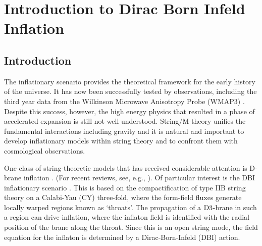 \renewcommand{\CVSrevision}{\version$Id: dbi-intro.tex,v 1.9 2009/07/28 10:13:51 ith Exp $}
\chapter{Introduction to Dirac Born Infeld Inflation}
\label{ch:dbi-intro}

\section{Introduction}
% 
\label{sec:dbi-intro}


The inflationary scenario provides the 
theoretical framework for the early history 
of the universe. It has now been successfully tested by observations, 
including the third year data from the Wilkinson Microwave Anisotropy 
Probe (WMAP3) \cite{spergel}. Despite this success, however, the high energy 
physics that resulted in a phase of accelerated expansion is still 
not well understood. String/M-theory unifies the fundamental interactions 
including gravity and it is natural and important to 
develop inflationary models within string theory and to confront them with 
cosmological observations. 
 

One class of string-theoretic models that has received 
considerable attention is D-brane inflation
\cite{brane1,brane2,brane3,brane4,brane5,
brane6,brane7,brane8,brane9,brane10,brane11,brane12,brane13,
brane14,brane15,brane16,brane17,Brodie:2003qv,Vikman:2006hk, 
Mukhanov:2005bu,Kallosh:2007wm,brane18,
brane19,brane20,brane21}. 
(For recent reviews, see, e.g., \cite{tyereview,cline}). 
Of particular interest 
is the DBI inflationary scenario \cite{brane6,brane11}. 
This is based on the compactification of type IIB string theory on a 
Calabi-Yau (CY) three-fold, where the form-field fluxes generate locally
warped regions known as `throats'.  The propagation of a 
${\rm D3}$-brane in such a region can drive inflation, where the inflaton 
field is identified with the radial position of the brane 
along the throat. Since this is an open string mode, the field 
equation for the inflaton is determined by a Dirac-Born-Infeld (DBI) action. 


